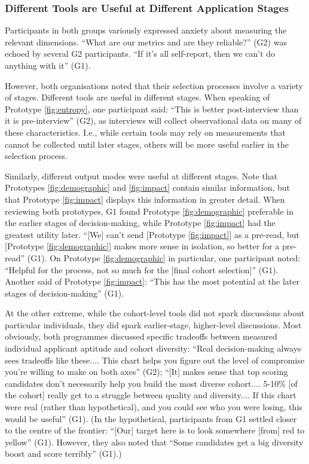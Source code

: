 \subsubsection{Different Tools are Useful at Different Application Stages}
Participants in both groups variously expressed anxiety about measuring the relevant dimensions. ``What are our metrics and are they reliable?'' (G2) was echoed by several G2 participants. ``If it's all self-report, then we can't do anything with it'' (G1). 

However, both organisations noted that their selection processes involve a variety of stages. Different tools are useful in different stages. When speaking of Prototype \ref{fig:entropy}, one participant said: ``This is better post-interview than it is pre-interview'' (G2), as interviews will collect observational data on many of these characteristics. I.e., while certain tools may rely on measurements that cannot be collected until later stages, others will be more useful earlier in the selection process.

Similarly, different output modes were useful at different stages. Note that Prototypes \ref{fig:demographic} and \ref{fig:impact} contain similar information, but that Prototype \ref{fig:impact} displays this information in greater detail. When reviewing both prototypes, G1 found Prototype \ref{fig:demographic} preferable in the earlier stages of decision-making, while Prototype \ref{fig:impact} had the greatest utility later. ``[We] can't send [Prototype \ref{fig:impact}] as a pre-read, but [Prototype \ref{fig:demographic}] makes more sense in isolation, so better for a pre-read'' (G1). On Prototype \ref{fig:demographic} in particular, one participant noted: ``Helpful for the process, not so much for the [final cohort selection]'' (G1). Another said of Prototype \ref{fig:impact}: ``This has the most potential at the later stages of decision-making'' (G1).

At the other extreme, while the cohort-level tools did not spark discussions about particular individuals, they did spark earlier-stage, higher-level discussions. Most obviously, both programmes discussed specific tradeoffs between measured individual applicant aptitude and cohort diversity: ``Real decision-making always sees tradeoffs like these.... This chart helps you figure out the level of compromise you're willing to make on both axes'' (G2); ``[It] makes sense that top scoring candidates don't necessarily help you build the most diverse cohort.... 5-10\% [of the cohort] really get to a struggle between quality and diversity.... If this chart were real (rather than hypothetical), and you could see who you were losing, this would be useful'' (G1). (In the hypothetical,  participants from G1 settled closer to the centre of the frontier: ``[Our] target here is to look somewhere [from] red to yellow'' (G1). However, they also noted that ``Some candidates get a big diversity boost and score terribly'' (G1).)

